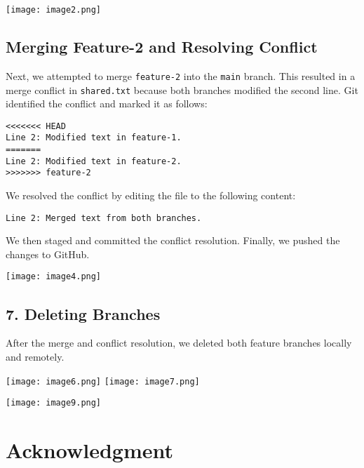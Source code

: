 \documentclass[a4paper,12pt]{article}
\begin{document}
\begin{center}
\texttt{[image: image2.png]} 
    \vspace{0.5cm}
\end{center}
\subsection{Merging Feature-2 and Resolving Conflict}
Next, we attempted to merge \texttt{feature-2} into the \texttt{main} branch. This resulted in a merge conflict in \texttt{shared.txt} because both branches modified the second line. Git identified the conflict and marked it as follows:
\begin{verbatim}
<<<<<<< HEAD
Line 2: Modified text in feature-1.
=======
Line 2: Modified text in feature-2.
>>>>>>> feature-2
\end{verbatim}
We resolved the conflict by editing the file to the following content:
\begin{verbatim}
Line 2: Merged text from both branches.
\end{verbatim}
We then staged and committed the conflict resolution. Finally, we pushed the changes to GitHub.\\

\begin{center}
     \texttt{[image: image4.png]} 
    \vspace{0.5cm}
\end{center}

\subsection*{7. Deleting Branches}
After the merge and conflict resolution, we deleted both feature branches locally and remotely.
\begin{center}
 \texttt{[image: image6.png]}
    \vspace{0.5cm}
     \texttt{[image: image7.png]}
    \vspace{0.5cm}
\end{center}
\begin{center}
\texttt{[image: image9.png]} 
    \vspace{0.5cm}
\end{center}
\newpage
\section{Acknowledgment}
\end{document}
